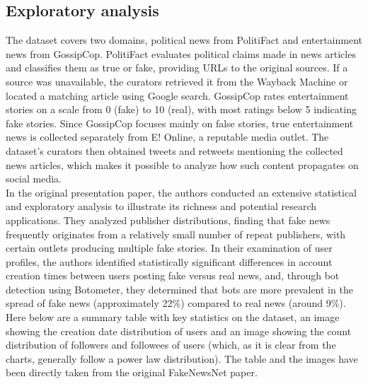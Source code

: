 \documentclass[a4paper,twoside,12pt]{book}
\begin{document}
\subsection*{Exploratory analysis}

The dataset covers two domains, political news from PolitiFact and entertainment news from GossipCop. PolitiFact evaluates political claims made in news articles and classifies them as true or fake, providing URLs to the original sources. If a source was unavailable, the curators retrieved it from the Wayback Machine or located a matching article using Google search. GossipCop rates entertainment stories on a scale from 0 (fake) to 10 (real), with most ratings below 5 indicating fake stories. Since GossipCop focuses mainly on false stories, true entertainment news is collected separately from E! Online, a reputable media outlet. The dataset's curators then obtained tweets and retweets mentioning the collected news articles, which makes it possible to analyze how such content propagates on social media. \\
In the original presentation paper, the authors conducted an extensive statistical and exploratory analysis to illustrate its richness and potential research applications. They analyzed publisher distributions, finding that fake news frequently originates from a relatively small number of repeat publishers, with certain outlets producing multiple fake stories. In their examination of user profiles, the authors identified statistically significant differences in account creation times between users posting fake versus real news, and, through bot detection using Botometer, they determined that bots are more prevalent in the spread of fake news (approximately 22\%) compared to real news (around 9\%). Here below are a summary table with key statistics on the dataset, an image showing the creation date distribution of users and an image showing the count distribution of followers and followees of users (which, as it is clear from the charts, generally follow a power law distribution). The table and the images have been directly taken from the original FakeNewsNet paper.
\vspace{3em}
\end{document}

